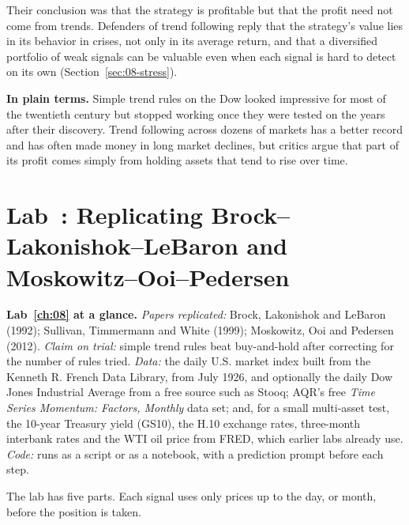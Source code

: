 Their conclusion was that the strategy is profitable but that the profit need not come from trends. Defenders of trend following reply that the strategy's value lies in its behavior in crises, not only in its average return, and that a diversified portfolio of weak signals can be valuable even when each signal is hard to detect on its own (Section~\ref{sec:08-stress}).

\noindent\textbf{In plain terms.} Simple trend rules on the Dow looked impressive for most of the twentieth century but stopped working once they were tested on the years after their discovery. Trend following across dozens of markets has a better record and has often made money in long market declines, but critics argue that part of its profit comes simply from holding assets that tend to rise over time.

\section{Lab~\thechapter: Replicating Brock--Lakonishok--LeBaron and Moskowitz--Ooi--Pedersen}
\label{sec:08-lab}

\begin{callout}
\textbf{Lab~\ref{ch:08} at a glance.} \emph{Papers replicated:} Brock, Lakonishok and LeBaron (1992); Sullivan, Timmermann and White (1999); Moskowitz, Ooi and Pedersen (2012). \emph{Claim on trial:} simple trend rules beat buy-and-hold after correcting for the number of rules tried. \emph{Data:} the daily U.S. market index built from the Kenneth R. French Data Library, from July 1926, and optionally the daily Dow Jones Industrial Average from a free source such as Stooq; AQR's free \emph{Time Series Momentum: Factors, Monthly} data set; and, for a small multi-asset test, the 10-year Treasury yield (GS10), the H.10 exchange rates, three-month interbank rates and the WTI oil price from FRED, which earlier labs already use. \emph{Code:} runs as a script or as a notebook, with a prediction prompt before each step.
\end{callout}

The lab has five parts. Each signal uses only prices up to the day, or month, before the position is taken.

